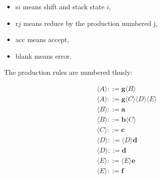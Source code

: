 \documentclass[twoside]{article}
\begin{document}
\begin{multicols}{2}
    \begin{itemize}
            \item s$i$ means shift and stack state $i$,
            \item r$j$ means reduce by the production numbered j,
            \item acc means accept,
            \item blank means error.
    \end{itemize}

    The production rules are numbered thusly:

    \begin{gather}
        \langle A \rangle ::= \textbf{g} \langle B \rangle \\
        \langle A \rangle ::= \textbf{g} \langle C \rangle \langle D \rangle \langle E \rangle \\
        \langle B \rangle ::= \textbf{a} \\
        \langle B \rangle ::= \textbf{b} \langle C \rangle \\
        \langle C \rangle ::= \textbf{c} \\
        \langle D \rangle ::= \langle D \rangle \textbf{d} \\
        \langle D \rangle ::= \textbf{d} \\
        \langle E \rangle ::= \langle E \rangle \textbf{e} \\
        \langle E \rangle ::= \textbf{f}
    \end{gather}


\end{multicols}
\end{document}
